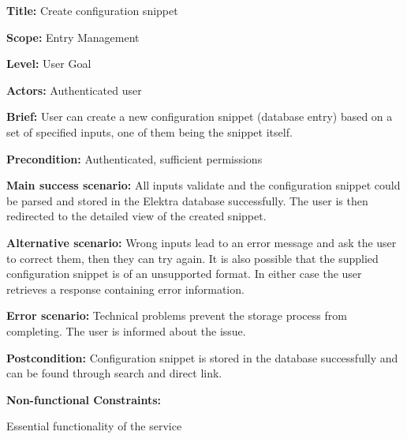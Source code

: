 
\begin{DoxyItemize}
\item {\bfseries{Title\+:}} Create configuration snippet
\item {\bfseries{Scope\+:}} Entry Management
\item {\bfseries{Level\+:}} User Goal
\item {\bfseries{Actors\+:}} Authenticated user
\item {\bfseries{Brief\+:}} User can create a new configuration snippet (database entry) based on a set of specified inputs, one of them being the snippet itself.
\end{DoxyItemize}


\begin{DoxyItemize}
\item {\bfseries{Precondition\+:}} Authenticated, sufficient permissions
\item {\bfseries{Main success scenario\+:}} All inputs validate and the configuration snippet could be parsed and stored in the Elektra database successfully. The user is then redirected to the detailed view of the created snippet.
\item {\bfseries{Alternative scenario\+:}} Wrong inputs lead to an error message and ask the user to correct them, then they can try again. It is also possible that the supplied configuration snippet is of an unsupported format. In either case the user retrieves a response containing error information.
\item {\bfseries{Error scenario\+:}} Technical problems prevent the storage process from completing. The user is informed about the issue.
\item {\bfseries{Postcondition\+:}} Configuration snippet is stored in the database successfully and can be found through search and direct link.
\item {\bfseries{Non-\/functional Constraints\+:}}
\begin{DoxyItemize}
\item Essential functionality of the service 
\end{DoxyItemize}
\end{DoxyItemize}